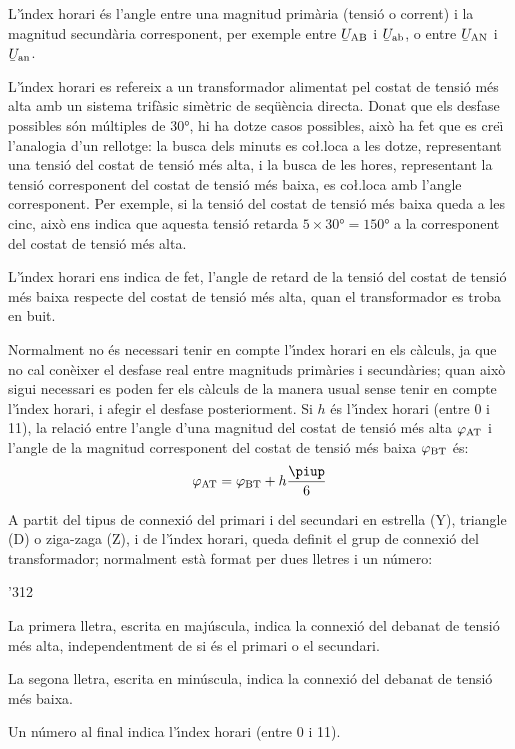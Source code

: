 L'\'{\i}ndex horari \'{e}s l'angle entre una magnitud  prim\`{a}ria (tensi\'{o} o corrent) i la magnitud secund\`{a}ria corresponent, per exemple entre $\cmplx{U}\ped{AB}$ i $\cmplx{U}\ped{ab}$, o entre $\cmplx{U}\ped{AN}$ i $\cmplx{U}\ped{an}$.

L'\'{\i}ndex horari es refereix a un transformador alimentat pel costat de tensi\'{o} m\'{e}s alta  amb un sistema trif\`{a}sic sim\`{e}tric de seq\"{u}\`{e}ncia directa. Donat que els desfase possibles s\'{o}n m\'{u}ltiples de $30\unit{\degree}$, hi ha dotze casos possibles, aix\`{o} ha fet que es cre\"{\i} l'analogia d'un rellotge: la busca dels minuts es co{\l.l}oca a les dotze, representant una tensi\'{o} del costat de tensi\'{o} m\'{e}s alta, i la busca de les hores, representant la tensi\'{o} corresponent del costat de tensi\'{o} m\'{e}s baixa, es co{\l.l}oca amb l'angle corresponent. Per exemple, si la tensi\'{o} del costat de tensi\'{o} m\'{e}s baixa queda a les cinc, aix\`{o} ens indica que aquesta tensi\'{o} retarda $5\times 30\unit{\degree}= 150\unit{\degree}$ a la corresponent del costat de tensi\'{o} m\'{e}s alta.

L'\'{\i}ndex horari ens indica de fet, l'angle de retard de la tensi\'{o} del costat de tensi\'{o} m\'{e}s baixa respecte del costat de tensi\'{o} m\'{e}s alta, quan el transformador es troba en buit.

Normalment no \'{e}s necessari tenir en compte l'\'{\i}ndex horari en els c\`{a}lculs, ja que no cal con\`{e}ixer el desfase real entre magnituds prim\`{a}ries i secund\`{a}ries; quan aix\`{o} sigui necessari es poden fer els c\`{a}lculs de la manera usual sense tenir en compte l'\'{\i}ndex horari, i afegir el desfase posteriorment. Si $h$ \'{e}s l'\'{\i}ndex horari (entre 0 i 11), la relaci\'{o} entre l'angle d'una magnitud del costat de tensi\'{o} m\'{e}s alta $\varphi_\mathrm{AT}$ i l'angle de la magnitud corresponent del costat de tensi\'{o} m\'{e}s baixa $\varphi_\mathrm{BT}$ \'{e}s:
\begin{equation}
    \varphi\ped{AT} = \varphi\ped{BT} + h\frac{\piup}{6}\label{eq:fi-AT-BT}
\end{equation}


A partit del tipus de connexi\'{o} del primari i del secundari en estrella (Y), triangle (D) o ziga-zaga (Z), i de l'\'{\i}ndex horari, queda definit el grup de connexi\'{o} del transformador; normalment est\`{a} format per dues lletres i un n\'{u}mero:
\begin{dingautolist}{'312}
   \item La primera lletra, escrita en maj\'{u}scula, indica la connexi\'{o} del debanat de tensi\'{o} m\'{e}s alta, independentment de si \'{e}s el primari o el secundari.
   \item La segona lletra, escrita en min\'{u}scula, indica la connexi\'{o} del debanat de tensi\'{o} m\'{e}s baixa.
   \item Un n\'{u}mero al final indica l'\'{\i}ndex horari (entre 0 i 11).
\end{dingautolist}

